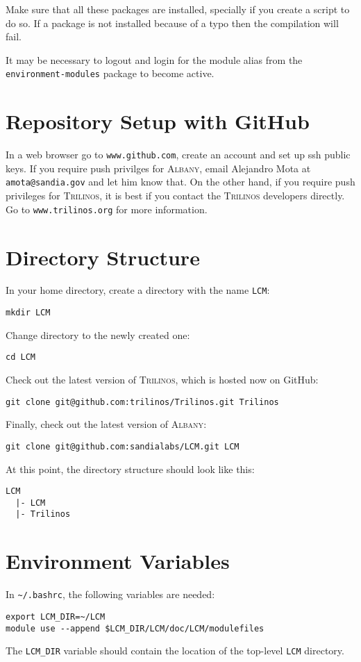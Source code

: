 \documentclass{article}
\newcommand{\trilinos}{\textsc{Trilinos}}
\newcommand{\albany}{\textsc{Albany}}
\begin{document}
Make sure that all these packages are installed, specially if you
create a script to do so. If a package is not installed because of a
typo then the compilation will fail.

It may be necessary to logout and login for the module alias from the
\verb+environment-modules+ package to become active.

\section{Repository Setup with GitHub}
\label{sec:repo}

In a web browser go to \verb+www.github.com+, create an account and
set up ssh public keys. If you require push privilges for \albany{},
email Alejandro Mota at \verb+amota@sandia.gov+ and let him know
that. On the other hand, if you require push privileges for \trilinos{},
it is best if you contact the \trilinos{} developers directly. Go to
\verb+www.trilinos.org+ for more information.

\section{Directory Structure}
In your home directory, create a directory with the name \verb+LCM+:
\begin{verbatim}
mkdir LCM
\end{verbatim}

Change directory to the newly created one:
\begin{verbatim}
cd LCM
\end{verbatim}

Check out the latest version of \trilinos{}, which is hosted now on
GitHub:
\begin{verbatim}
git clone git@github.com:trilinos/Trilinos.git Trilinos
\end{verbatim}

Finally, check out the latest version of \albany{}:
\begin{verbatim}
git clone git@github.com:sandialabs/LCM.git LCM
\end{verbatim}

At this point, the directory structure should look like this:
\begin{verbatim}
LCM
  |- LCM
  |- Trilinos
\end{verbatim}

\section{Environment Variables}
In \verb+~/.bashrc+, the following variables are needed:
\begin{verbatim}
export LCM_DIR=~/LCM
module use --append $LCM_DIR/LCM/doc/LCM/modulefiles
\end{verbatim}
The \verb+LCM_DIR+ variable should contain the location of the
top-level \verb+LCM+ directory.
\end{document}
